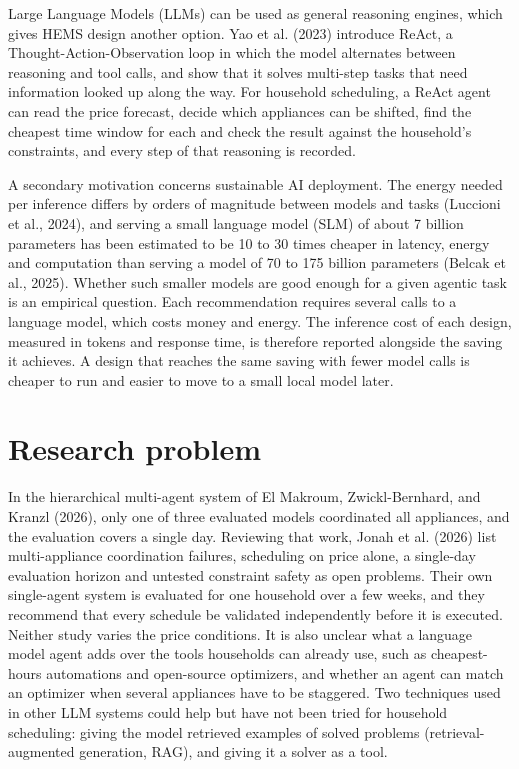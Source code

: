 \documentclass[12pt,a4paper]{report}
\begin{document}
Large Language Models (LLMs) can be used as general reasoning engines,
which gives HEMS design another option. Yao et al. (2023) introduce
ReAct, a Thought-\allowbreak Action-\allowbreak Observation loop in which the model alternates
between reasoning and tool calls, and show that it solves multi-step
tasks that need information looked up along the way. For household
scheduling, a ReAct agent can read the price forecast, decide which
appliances can be shifted, find the cheapest time window for each and
check the result against the household's constraints, and every step of
that reasoning is recorded.

A secondary motivation concerns sustainable AI deployment. The energy
needed per inference differs by orders of magnitude between models and
tasks (Luccioni et al., 2024), and serving a small language model (SLM)
of about 7 billion parameters has been estimated to be 10 to 30 times
cheaper in latency, energy and computation than serving a model of 70
to 175 billion parameters (Belcak et al., 2025). Whether such smaller
models are good enough for a given agentic task is an empirical
question. Each recommendation requires several calls to a language
model, which costs money and energy. The inference cost of each design,
measured in tokens and response time, is therefore reported alongside
the saving it achieves. A design that reaches the same saving with
fewer model calls is cheaper to run and easier to move to a small local
model later.

\section{Research problem}
\label{sec:problem}

In the hierarchical multi-agent system of El Makroum, Zwickl-Bernhard, and Kranzl (2026), only one
of three evaluated models coordinated all appliances, and the evaluation
covers a single day. Reviewing that work, Jonah et al. (2026) list
multi-appliance coordination failures, scheduling on price alone, a
single-day evaluation horizon and untested constraint safety as open
problems. Their own single-agent system is evaluated for one household
over a few weeks, and they recommend that every schedule be validated
independently before it is executed. Neither study varies the price
conditions. It is also unclear what a language model agent adds over the
tools households can already use, such as cheapest-hours automations and
open-source optimizers, and whether an agent can match an optimizer when
several appliances have to be staggered. Two techniques used in other
LLM systems could help but have not been tried for household
scheduling: giving the model retrieved examples of solved problems
(retrieval-augmented generation, RAG), and giving it a solver as a tool.
\end{document}

